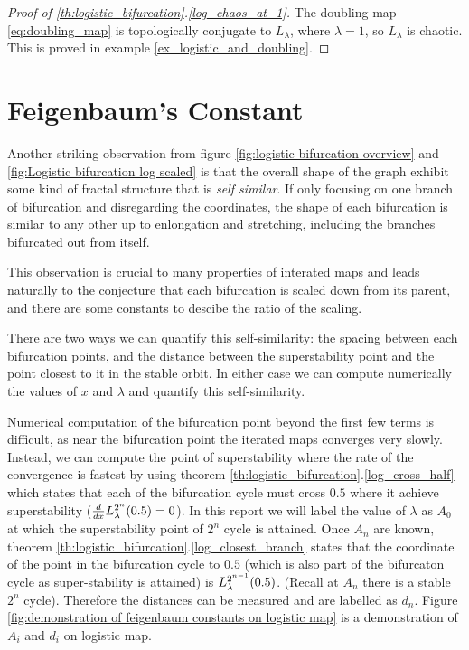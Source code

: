 \begin{proof}[Proof of \ref{th:logistic_bifurcation}.\ref{log_chaos_at_1}]
	The doubling map \eqref{eq:doubling_map} is topologically conjugate to $L_{\lambda}$, where $\lambda = 1$, so $L_{\lambda}$ is chaotic.
	This is proved in example \ref{ex_logistic_and_doubling}.
\end{proof}

\section{Feigenbaum's Constant}

Another striking observation from figure \ref{fig:logistic bifurcation overview} and \ref{fig:Logistic bifurcation log scaled} is that the overall shape of the graph exhibit some kind of fractal structure that is \emph{self similar}.
If only focusing on one branch of bifurcation and disregarding the coordinates, the shape of each bifurcation is similar to any other up to enlongation and stretching, including the branches bifurcated out from itself.
 
 This observation is crucial to many properties of interated maps and leads naturally to the conjecture that each bifurcation is scaled down from its parent, and there are some constants to descibe the ratio of the scaling. 

 There are two ways we can quantify this self-similarity: the spacing between each bifurcation points, and the distance between the superstability point and the point closest to it in the stable orbit. 
 In either case we can compute numerically the values of $x$ and $\lambda$ and quantify this self-similarity.

 Numerical computation of the bifurcation point beyond the first few terms is difficult, as near the bifurcation point the iterated maps converges very slowly.
 Instead, we can compute the point of superstability where the rate of the convergence is fastest by using theorem \ref{th:logistic_bifurcation}.\ref{log_cross_half} which states that each of the bifurcation cycle must cross $0.5$ where it achieve superstability ($\frac{d}{dx}L_{\lambda}^{2^n}(0.5) = 0$).
In this report we will label the value of $\lambda$ as $A_0$ at which the superstability point of $2^n$ cycle is attained.
Once $A_n$ are known, theorem \ref{th:logistic_bifurcation}.\ref{log_closest_branch} states that the coordinate of the point in the bifurcation cycle to $0.5$ (which is also part of the bifurcaton cycle as super-stability is attained) is $L_{\lambda}^{2^{n-1}}(0.5)$. (Recall at $A_n$ there is a stable $2^n$ cycle).
Therefore the distances can be measured and are labelled as $d_n$.
Figure \ref{fig:demonstration of feigenbaum constants on logistic map} is a demonstration of $A_i$ and $d_i$ on logistic map.

